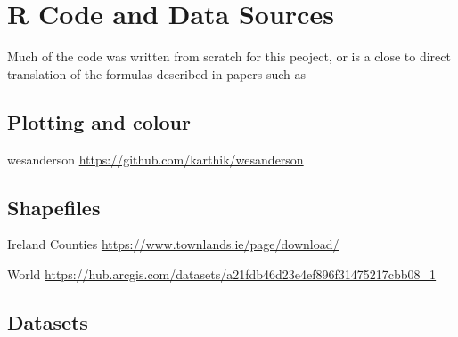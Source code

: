 \section{R Code and Data Sources}
\label{ch:codesource}

Much of the code was written from scratch for this peoject, or is a close to direct translation of the formulas described in papers such as %

\subsection{Plotting and colour}

wesanderson \url{https://github.com/karthik/wesanderson}

\subsection{Shapefiles}

Ireland Counties \url{https://www.townlands.ie/page/download/}

World \url{https://hub.arcgis.com/datasets/a21fdb46d23e4ef896f31475217cbb08_1}

\subsection{Datasets}

